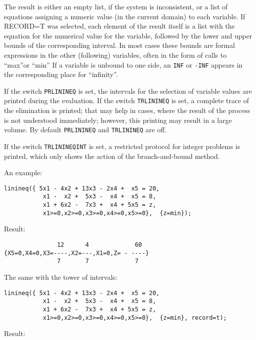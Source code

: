 The result is either an empty list, if the system is inconsistent,
or a list of equations assigning a numeric value (in the current
domain) to each variable. If RECORD=T was selected, each element
of the result itself is a list with the equation for the numerical
value for the variable, followed by the lower and upper bounds
of the corresponding interval. In most cases these bounds are
formal expressions in the other (following) variables, often in
the form of calls to ``max''or ``min'' If a variable is unbound to one
side, an {\tt INF} or {\tt -INF} appears in the corresponding place for
``infinity''.

If the switch {\tt PRLININEQ} is set, the intervals for the selection
of variable values are printed during the evaluation.
If the switch {\tt TRLININEQ} is set, a complete trace of the
elimination is printed; that may help in cases, where the result of
the process is not understood immediately; however, this printing may
result in a large volume.
By default {\tt PRLININEQ} and {\tt TRLININEQ} are off.

If the switch {\tt TRLININEQINT} is set, a restricted protocol for
integer problems is printed, which only shows the action of the
branch-and-bound method. 

\noindent An example:

\begin{verbatim}
linineq({ 5x1 - 4x2 + 13x3 - 2x4 +  x5 = 20,
           x1 -  x2 +  5x3 -  x4 +  x5 = 8,
           x1 + 6x2 -  7x3 +  x4 + 5x5 = z,
           x1>=0,x2>=0,x3>=0,x4>=0,x5>=0},  {z=min});
\end{verbatim}

\noindent Result:

\begin{verbatim}
               12      4             60
{X5=0,X4=0,X3=----,X2=---,X1=0,Z= - ----}
               7       7             7
\end{verbatim}

\noindent The same with the tower of intervals:

\begin{verbatim}
linineq({ 5x1 - 4x2 + 13x3 - 2x4 +  x5 = 20,
           x1 -  x2 +  5x3 -  x4 +  x5 = 8,
           x1 + 6x2 -  7x3 +  x4 + 5x5 = z,
           x1>=0,x2>=0,x3>=0,x4>=0,x5>=0},  {z=min}, record=t);
\end{verbatim}

\noindent Result:

